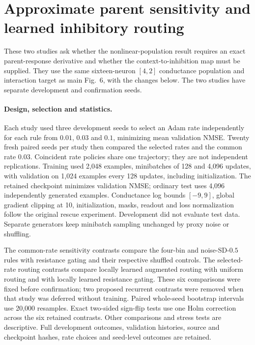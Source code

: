 \section{Approximate parent sensitivity and learned inhibitory routing}
\label{note:optional_extensions}

These two studies ask whether the nonlinear-population result requires an exact parent-response derivative and whether the context-to-inhibition map must be supplied. They use the same sixteen-neuron $[4,2]$ conductance population and interaction target as main Fig.~6, with the changes below. The two studies have separate development and confirmation seeds.

\paragraph{Design, selection and statistics.}
Each study used three development seeds to select an Adam rate independently for each rule from $0.01$, $0.03$ and $0.1$, minimizing mean validation NMSE. Twenty fresh paired seeds per study then compared the selected rates and the common rate $0.03$. Coincident rate policies share one trajectory; they are not independent replications. Training used 2,048 examples, minibatches of 128 and 4,096 updates, with validation on 1,024 examples every 128 updates, including initialization. The retained checkpoint minimizes validation NMSE; ordinary test uses 4,096 independently generated examples. Conductance log bounds $[-9,9]$, global gradient clipping at 10, initialization, masks, readout and loss normalization follow the original rescue experiment. Development did not evaluate test data. Separate generators keep minibatch sampling unchanged by proxy noise or shuffling.

The common-rate sensitivity contrasts compare the four-bin and noise-SD-$0.5$ rules with resistance gating and their respective shuffled controls. The selected-rate routing contrasts compare locally learned augmented routing with uniform routing and with locally learned resistance gating. These six comparisons were fixed before confirmation; two proposed recurrent contrasts were removed when that study was deferred without training. Paired whole-seed bootstrap intervals use 20,000 resamples. Exact two-sided sign-flip tests use one Holm correction across the six retained contrasts. Other comparisons and stress tests are descriptive. Full development outcomes, validation histories, source and checkpoint hashes, rate choices and seed-level outcomes are retained.

